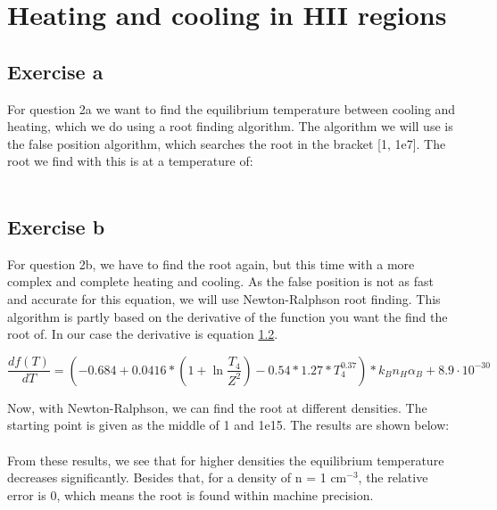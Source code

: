\section{Heating and cooling in HII regions}

\subsection{Exercise a}

For question 2a we want to find the equilibrium temperature between cooling and heating, which we do using a root finding algorithm. The algorithm we will use is the false position algorithm, which searches the root in the bracket [1, 1e7]. The root we find with this is at a temperature of:
\\
\\


\subsection{Exercise b}

For question 2b, we have to find the root again, but this time with a more complex and complete heating and cooling. As the false position is not as fast and accurate for this equation, we will use Newton-Ralphson root finding. This algorithm is partly based on the derivative of the function you want the find the root of. In our case the derivative is equation \ref{}.

\begin{equation}
    \frac{df(T)}{dT} = (-0.684 + 0.0416 * (1 + \ln{\frac{T_4}{Z^2}} ) - 0.54 * 1.27 * T_4^{0.37}) * k_B n_H \alpha_B + 8.9\cdot10^{-30}
\end{equation}

Now, with Newton-Ralphson, we can find the root at different densities. The starting point is given as the middle of 1 and 1e15. The results are shown below:
\\
\\


From these results, we see that for higher densities the equilibrium temperature decreases significantly. Besides that, for a density of n = 1 $\mathrm{cm^{-3}}$, the relative error is 0, which means the root is found within machine precision. 

